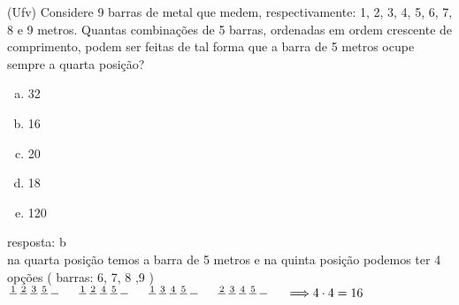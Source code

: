\begin{ex}
 (Ufv) Considere 9 barras de metal que medem, respectivamente: 1, 2,  3, 4, 5, 6, 7, 8 e 9 metros. Quantas combinações de 5 barras, ordenadas em ordem crescente de comprimento, podem ser feitas de tal forma que a barra de 5 metros ocupe sempre a quarta posição?
    \begin{enumerate}[(a)]
    \item 32
    \item 16
    \item 20
    \item 18
    \item 120
    \end{enumerate}
      \begin{sol}
       resposta: b \\
       na quarta posição temos a  barra de 5 metros e na quinta posição podemos ter 4 opções ( barras: 6, 7, 8 ,9 ) \\
       $\frac{1}{\phantom{A}}\frac{2}{\phantom{A}}\frac{3}{\phantom{A}}\frac{5}{\phantom{A}}\frac{\phantom{A}}{\phantom{A}}\hspace{0.5cm}\frac{1}{\phantom{A}}\frac{2}{\phantom{A}}\frac{4}{\phantom{A}}\frac{5}{\phantom{A}}\frac{\phantom{A}}{\phantom{A}}\hspace{0.5cm}\frac{1}{\phantom{A}}\frac{3}{\phantom{A}}\frac{4}{\phantom{A}}\frac{5}{\phantom{A}}\frac{\phantom{A}}{\phantom{A}}\hspace{0.5cm}\frac{2}{\phantom{A}}\frac{3}{\phantom{A}}\frac{4}{\phantom{A}}\frac{5}{\phantom{A}}\frac{\phantom{A}}{\phantom{A}}\hspace{0.5cm}\Longrightarrow 4\cdot4=16$
      \end{sol}
\end{ex}